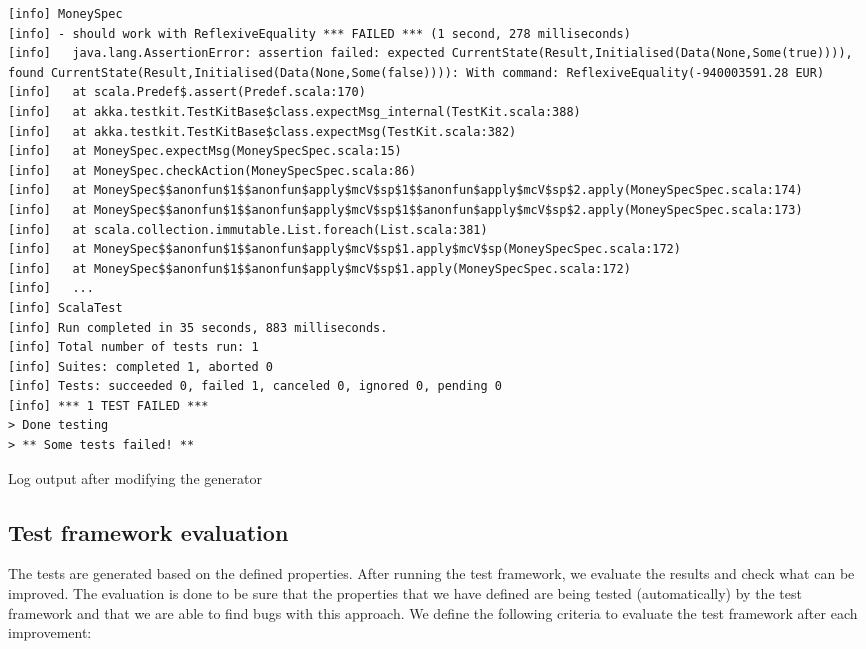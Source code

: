 \begin{sourcecode}[!ht]
\begin{lstlisting}[language=Log]
[info] MoneySpec
[info] - should work with ReflexiveEquality *** FAILED *** (1 second, 278 milliseconds)
[info]   java.lang.AssertionError: assertion failed: expected CurrentState(Result,Initialised(Data(None,Some(true)))), found CurrentState(Result,Initialised(Data(None,Some(false)))): With command: ReflexiveEquality(-940003591.28 EUR)
[info]   at scala.Predef$.assert(Predef.scala:170)
[info]   at akka.testkit.TestKitBase$class.expectMsg_internal(TestKit.scala:388)
[info]   at akka.testkit.TestKitBase$class.expectMsg(TestKit.scala:382)
[info]   at MoneySpec.expectMsg(MoneySpecSpec.scala:15)
[info]   at MoneySpec.checkAction(MoneySpecSpec.scala:86)
[info]   at MoneySpec$$anonfun$1$$anonfun$apply$mcV$sp$1$$anonfun$apply$mcV$sp$2.apply(MoneySpecSpec.scala:174)
[info]   at MoneySpec$$anonfun$1$$anonfun$apply$mcV$sp$1$$anonfun$apply$mcV$sp$2.apply(MoneySpecSpec.scala:173)
[info]   at scala.collection.immutable.List.foreach(List.scala:381)
[info]   at MoneySpec$$anonfun$1$$anonfun$apply$mcV$sp$1.apply$mcV$sp(MoneySpecSpec.scala:172)
[info]   at MoneySpec$$anonfun$1$$anonfun$apply$mcV$sp$1.apply(MoneySpecSpec.scala:172)
[info]   ...
[info] ScalaTest
[info] Run completed in 35 seconds, 883 milliseconds.
[info] Total number of tests run: 1
[info] Suites: completed 1, aborted 0
[info] Tests: succeeded 0, failed 1, canceled 0, ignored 0, pending 0
[info] *** 1 TEST FAILED ***
> Done testing
> ** Some tests failed! **
\end{lstlisting}
\caption{Log output after modifying the generator}
\label{lst:ch3_log_testrun_failed}
\end{sourcecode}
\FloatBarrier\noindent

\subsection{Test framework evaluation}
The tests are generated based on the defined properties. After running the test
framework, we evaluate the results and check what can be improved. The
evaluation is done to be sure that the properties that we have defined are being
tested (automatically) by the test framework and that we are able to find bugs
with this approach. We define the following criteria to evaluate the test
framework after each improvement:


